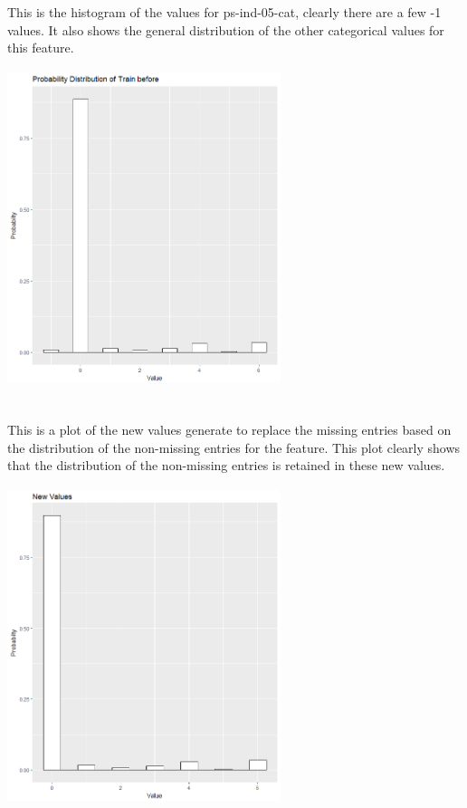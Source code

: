 \documentclass[fleqn,10pt]{SelfArx} %
\begin{document}
This is the histogram of the values for ps-ind-05-cat, clearly there are a few -1 values. It also shows the general distribution of the other categorical values for this feature.\\ 
\includegraphics[width=8cm, height=10cm]{ex_before} \\
\\
This is a plot of the new values generate to replace the missing entries based on the distribution of the non-missing entries for the feature. This plot clearly shows that the distribution of the non-missing entries is retained in these new values.\\
\includegraphics[width=8cm, height=10cm]{ex_new} \\
\end{document}
